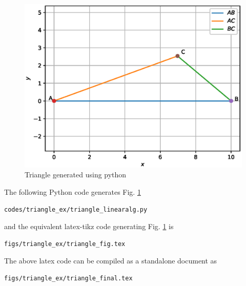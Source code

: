 \begin{enumerate}[label=\thesubsection.\arabic*.,ref=\thesubsection.\theenumi]
\begin{figure}[!ht]
\centering
\includegraphics[width=\columnwidth]{./figs/triangle_ex/triangle_linearalg.eps}
\caption{Triangle generated using python}
\label{fig:triangle2_triangle_ex}
\end{figure} 

\solution The  following Python code generates Fig. \ref{fig:triangle2_triangle_ex}

\begin{lstlisting}
codes/triangle_ex/triangle_linearalg.py
\end{lstlisting}

and the equivalent latex-tikz code generating Fig. \ref{fig:triangle2_triangle_ex} is 
\begin{lstlisting}
figs/triangle_ex/triangle_fig.tex
\end{lstlisting}
%
The above latex code can be compiled as a standalone document as
\begin{lstlisting}
figs/triangle_ex/triangle_final.tex
\end{lstlisting}
\end{enumerate}

